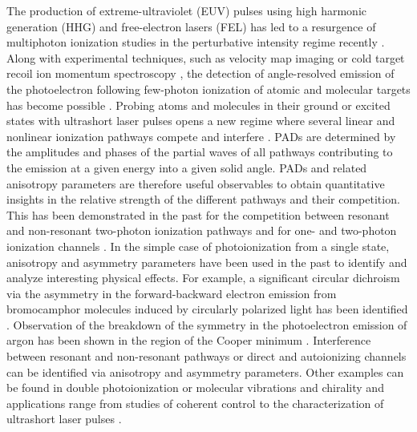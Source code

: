 The production of extreme-ultraviolet (EUV) pulses using high harmonic generation (HHG) and free-electron lasers (FEL) has led to a resurgence of multiphoton ionization studies in the perturbative intensity regime recently \cite{nikolopoulos2001,vanderhart2005,shakeshaft2007,pi2010,florescu2011,sato2011,haber2011,florescu2012,ishikawa2012,ishikawa2013,ma2013,rey2014,grum-grzhimailo2015,douguet2016,hofbrucker2017,hofbrucker2018,boll2019,wang2019}. Along with experimental techniques, such as velocity map imaging \cite{kornilov2010,rouzee2011} or cold target recoil ion momentum spectroscopy \cite{ullrich2003}, the detection of angle-resolved emission of the photoelectron following few-photon ionization of atomic and molecular targets has become possible \cite{ma2013}. Probing atoms and molecules in their ground or excited states with ultrashort laser pulses opens a new regime where several linear and nonlinear ionization pathways compete and interfere \cite{ishikawa2012,ma2013,grum-grzhimailo2015,douguet2016,hofbrucker2018,boll2019,wang2019,venzke2020_ionization}.
PADs are determined by the amplitudes and phases of the partial waves of all pathways contributing to the emission at a given energy into a given solid angle. PADs and related anisotropy parameters are therefore useful observables to obtain quantitative insights in the relative strength of the different pathways and their competition. This has been demonstrated in the past for the competition between resonant and non-resonant two-photon ionization pathways \cite{ishikawa2012,ishikawa2013,ma2013} and for one- and two-photon ionization channels \cite{grum-grzhimailo2015,douguet2016,boll2019}.
In the simple case of photoionization from a single state, anisotropy and asymmetry parameters have been used in the past to identify and analyze interesting physical effects. For example, a significant circular dichroism via the asymmetry in the forward-backward electron emission from bromocamphor molecules induced by circularly polarized light has been identified  \cite{bowering2001}. Observation of the breakdown of the symmetry in the photoelectron emission of argon has been shown in the region of the Cooper minimum \cite{ilchen2018}. Interference between resonant and non-resonant pathways \cite{ishikawa2012} or direct and autoionizing channels \cite{cirelli2018} can be identified via anisotropy and asymmetry parameters. Other examples can be found in double photoionization \cite{maulbetsch1992} or molecular vibrations and chirality \cite{garcia2013} and applications range from studies of coherent control \cite{prince2016} to the characterization of ultrashort laser pulses \cite{chelkowski2002}.

